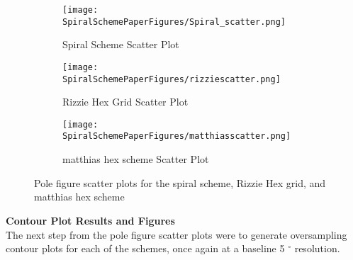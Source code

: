 \documentclass{article}
\begin{document}
\begin{figure}[H]
\begin{subfigure}{.5\textwidth}
  \centering
  \texttt{[image: SpiralSchemePaperFigures/Spiral\_scatter.png]}
  \caption{Spiral Scheme Scatter Plot}
  \label{fig:sfig1}
\end{subfigure}%
\begin{subfigure}{.5\textwidth}
  \centering
  \texttt{[image: SpiralSchemePaperFigures/rizziescatter.png]}
  \caption{Rizzie Hex Grid Scatter Plot}
  \label{fig:sfig2}
\end{subfigure}
\begin{subfigure}{\textwidth}
  \centering
  \texttt{[image: SpiralSchemePaperFigures/matthiasscatter.png]}
  \caption{matthias hex scheme Scatter Plot}
  \label{fig:sfig3}
\end{subfigure}
\caption{Pole figure scatter plots for the spiral scheme, Rizzie Hex grid, and matthias hex scheme}
\label{fig:fig}
\end{figure}

\begin{table}[H]
    \centering
    \caption{Table summarizing the number of sampling points for each tested scheme resolution}
\end{table}



\textbf{Contour Plot Results and Figures}\\


The next step from the pole figure scatter plots were to generate oversampling contour plots for each of the schemes, once again at a baseline 5 $^\circ$ resolution.
\end{document}
